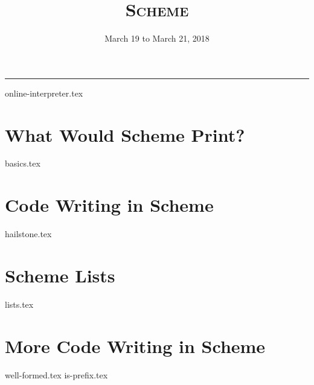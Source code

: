 \documentclass{exam}
\title{\textsc{Scheme}}
\date{March 19 to March 21, 2018}
\begin{document}
\maketitle
\rule{\textwidth}{0.15em}
\fontsize{12}{15}\selectfont

{online-interpreter.tex}
\begin{questions}
\section{What Would Scheme Print?}
{basics.tex}

\section{Code Writing in Scheme}
{hailstone.tex}

\section{Scheme Lists}
{lists.tex}

\section{More Code Writing in Scheme}
{well-formed.tex}
{is-prefix.tex}

\end{questions}
\end{document}
